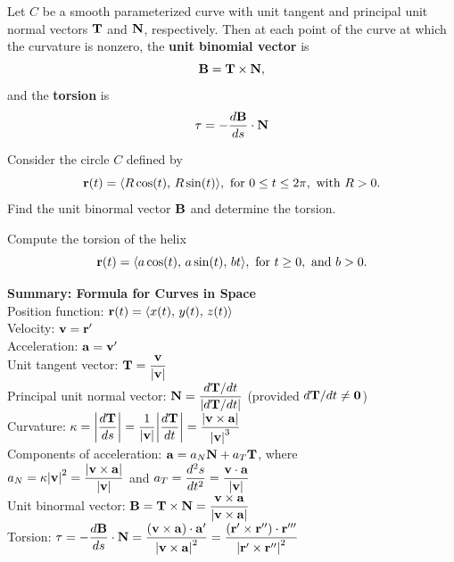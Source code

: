 \documentclass[../mathNotesPreamble]{subfiles}
\begin{document}
  \begin{defn*}
    Let $C$ be a smooth parameterized curve with unit tangent and principal unit normal vectors ${\mathbf{T}}$ and ${\mathbf{N}}$, respectively. Then at each point of the curve at which the curvature is nonzero, the \textbf{unit binomial vector} is
      \[{\mathbf{B}}={\mathbf{T}}\times{\mathbf{N}},\]
    and the \textbf{torsion} is
      \[\tau=-\frac{d{\mathbf{B}}}{ds}\cdot{\mathbf{N}}\]
  \end{defn*}
  \pagebreak

  \begin{ex*}
    Consider the circle $C$ defined by
      \[{\mathbf{r}}(t)={\left\langle R\cos(t),\,R\sin(t) \right\rangle}, \textnormal{ for }0\leq t\leq 2\pi,\textnormal{ with }R>0.\]
    Find the unit binormal vector ${\mathbf{B}}$ and determine the torsion.
  \end{ex*}

  \begin{ex*}
    Compute the torsion of the helix
      \[{\mathbf{r}}(t)={\left\langle a\cos(t),\,a\sin(t),\,bt \right\rangle}, \textnormal{ for }t\geq 0,\textnormal{ and }b>0.\]
  \end{ex*}

  \pagebreak

  \begin{thmBox*}
    \textbf{Summary: Formula for Curves in Space}\\
    Position function: \tab ${\mathbf{r}}(t)={\left\langle x(t),\,y(t),\,z(t) \right\rangle}$\\[\baselineskip]
    Velocity: \tab ${\mathbf{v}}={\mathbf{r}}'$\\[\baselineskip]
    Acceleration: \tab ${\mathbf{a}}={\mathbf{v}}'$\\[\baselineskip]
    Unit tangent vector: \tab $\displaystyle{\mathbf{T}}=\frac{{\mathbf{v}}}{{\left\vert{\mathbf{v}}\right\vert}}$\\[\baselineskip]
    Principal unit normal vector: \tab $\displaystyle{\mathbf{N}}=\frac{d{\mathbf{T}}/dt}{{\left\vert d{\mathbf{T}}/dt\right\vert}}$ (provided $d{\mathbf{T}}/dt\neq \mathbf{0}$)\\[\baselineskip]
    Curvature: \tab $\displaystyle\kappa={\left\vert\frac{d{\mathbf{T}}}{ds}\right\vert}=\frac{1}{{\left\vert{\mathbf{v}}\right\vert}}{\left\vert\frac{d{\mathbf{T}}}{dt}\right\vert}=\frac{{\left\vert{\mathbf{v}}\times{\mathbf{a}}\right\vert}}{{\left\vert{\mathbf{v}}\right\vert}^3}$\\[\baselineskip]
    Components of acceleration: \tab ${\mathbf{a}}=a_N{\mathbf{N}}+a_T{\mathbf{T}}$, where\\[\baselineskip]
    \mbox{}\tab $\displaystyle a_N=\kappa{\left\vert{\mathbf{v}}\right\vert}^2=\frac{{\left\vert{\mathbf{v}}\times{\mathbf{a}}\right\vert}}{{\left\vert{\mathbf{v}}\right\vert}}$ and $\displaystyle a_T=\frac{d^2s}{dt^2}=\frac{{\mathbf{v}}\cdot{\mathbf{a}}}{{\left\vert{\mathbf{v}}\right\vert}}$\\[1.5\baselineskip]
    Unit binormal vector: \tab $\displaystyle{\mathbf{B}}={\mathbf{T}}\times{\mathbf{N}}=\frac{{\mathbf{v}}\times{\mathbf{a}}}{{\left\vert{\mathbf{v}}\times{\mathbf{a}}\right\vert}}$\\[\baselineskip]
    Torsion: \tab $\displaystyle\tau=-\frac{d{\mathbf{B}}}{ds}\cdot{\mathbf{N}}=\frac{{\left({\mathbf{v}}\times{\mathbf{a}}\right)}\cdot{\mathbf{a}}'}{{\left\vert{\mathbf{v}}\times{\mathbf{a}}\right\vert}^2}=\frac{{\left({\mathbf{r}}'\times{\mathbf{r}}''\right)}\cdot{\mathbf{r}}'''}{{\left\vert{\mathbf{r}}'\times{\mathbf{r}}''\right\vert}^2}$
  \end{thmBox*}

  \pagebreak
  
\end{document}
